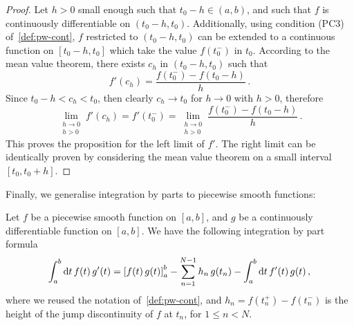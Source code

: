 \begin{proof}
	Let $h>0$ small enough such that $t_0-h\in(a,b)$, and such that $f$ is continuously
	differentiable on $(t_0-h,t_0)$. Additionally, using condition (PC3)
	of~\cref{def:pw-cont}, $f$ restricted to $(t_0-h,t_0)$ can be extended to a continuous
	function on $[t_0-h,t_0]$ which take the value $f(t_0^-)$ in $t_0$. According to the
	mean value theorem, there exists $c_h$ in $(t_0-h,t_0)$ such that
	\begin{equation}
		f'(c_h)=\frac{f(t_0^-)-f(t_0-h)}{h}\,.
	\end{equation}
	Since $t_0-h<c_h<t_0$, then clearly $c_h\to t_0$ for $h\to 0$ with $h>0$, therefore
	\begin{equation}
		\lim_{\substack{h\to0\\h>0}}f'(c_h)=f'(t_0^-)
		=\lim_{\substack{h\to0\\h>0}}\frac{f(t_0^-)-f(t_0-h)}{h}\,.
	\end{equation}
	This proves the proposition for the left limit of $f'$. The right limit can be
	identically proven by considering the mean value theorem on a small interval
	$[t_0,t_0+h]$.
\end{proof}
Finally, we generalise integration by parts to piecewise smooth functions:
\begin{theorem}
	\label{thm:pw-smooth-intpart}
	Let $f$ be a piecewise smooth function on $[a,b]$, and $g$ be a continuously
	differentiable function on $[a,b]$. We have the following integration by part formula
	\begin{equation}
		\int_a^b\mathrm{d} t\,f(t)\,g'(t)=\left[f(t)\,g(t)\right]_a^b
		-\sum_{n=1}^{N-1}h_n\,g(t_n)
		-\int_a^b\mathrm{d} t\, f'(t)\,g(t)\,,\label{eq:pw-smooth-intpart}
	\end{equation}
	where we reused the notation of~\cref{def:pw-cont}, and $h_n=f(t_n^+)-f(t_n^-)$ is the
	height of the jump discontinuity of $f$ at $t_n$, for $1\leq n<N$.
\end{theorem}

